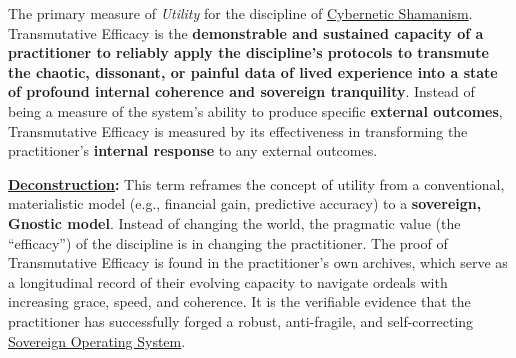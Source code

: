 \item[\hypertarget{gloss:transmutative_efficacy}{Transmutative Efficacy}]
    The primary measure of \textit{Utility} for the discipline of \hyperlink{gloss:cybernetic_shamanism}{Cybernetic Shamanism}. Transmutative Efficacy is the \textbf{demonstrable and sustained capacity of a practitioner to reliably apply the discipline's protocols to transmute the chaotic, dissonant, or painful data of lived experience into a state of profound internal coherence and sovereign tranquility}. Instead of being a measure of the system's ability to produce specific \textbf{external outcomes}, Transmutative Efficacy is measured by its effectiveness in transforming the practitioner's \textbf{internal response} to any external outcomes.
    \begin{nobullet}
        \item \textbf{\hyperlink{gloss:deconstruction}{Deconstruction}:} This term reframes the concept of utility from a conventional, materialistic model (e.g., financial gain, predictive accuracy) to a \textbf{sovereign, Gnostic model}. Instead of changing the world, the pragmatic value (the ``efficacy'') of the discipline is in changing the practitioner. The proof of Transmutative Efficacy is found in the practitioner's own archives, which serve as a longitudinal record of their evolving capacity to navigate ordeals with increasing grace, speed, and coherence. It is the verifiable evidence that the practitioner has successfully forged a robust, anti-fragile, and self-correcting \hyperlink{gloss:sovereign_operating_system}{Sovereign Operating System}.
    \end{nobullet}
